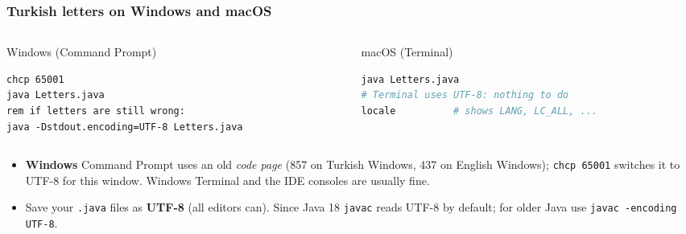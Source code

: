 \documentclass[aspectratio=169,10pt,compress]{beamer}
\newcommand{\win}{\textbf{Windows}}
\begin{document}
\begin{frame}[t,fragile] \frametitle{Turkish letters on Windows and macOS}
  \begin{columns}[T]
    \begin{column}{0.48\textwidth}
      \begin{block}{Windows (Command Prompt)}


\begin{lstlisting}[style=codesnippet, language={}, basicstyle=\ttfamily\scriptsize]
chcp 65001
java Letters.java
rem if letters are still wrong:
java -Dstdout.encoding=UTF-8 Letters.java
\end{lstlisting}


      \end{block}
    \end{column}
    \begin{column}{0.48\textwidth}
      \begin{block}{macOS (Terminal)}


\begin{lstlisting}[style=codesnippet, language=bash, basicstyle=\ttfamily\scriptsize]
java Letters.java
# Terminal uses UTF-8: nothing to do
locale          # shows LANG, LC_ALL, ...
\end{lstlisting}


      \end{block}
    \end{column}
  \end{columns}

  \vspace{0.3em}
  \begin{itemize}\small
    \item \win{} Command Prompt uses an old \emph{code page} (857 on Turkish Windows, 437 on English Windows);
      \texttt{chcp 65001} switches it to UTF-8 for this window. Windows Terminal and the IDE consoles are usually fine.
    \item Save your \texttt{.java} files as \textbf{UTF-8} (all editors can). Since Java 18 \texttt{javac} reads UTF-8 by default;
      for older Java use \texttt{javac -encoding UTF-8}.
  \end{itemize}
\end{frame}
\end{document}
